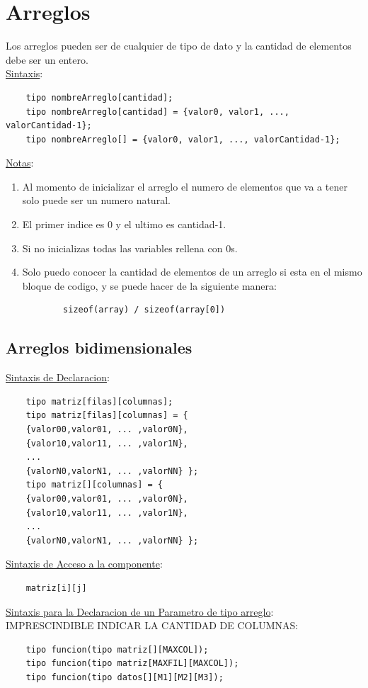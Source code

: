 \documentclass{article}
\begin{document}
\newpage
\section{Arreglos}
Los arreglos pueden ser de cualquier de tipo de dato y la cantidad de elementos debe ser un entero.
\\\underline{Sintaxis}:
\begin{lstlisting}
    tipo nombreArreglo[cantidad];
    tipo nombreArreglo[cantidad] = {valor0, valor1, ..., valorCantidad-1};
    tipo nombreArreglo[] = {valor0, valor1, ..., valorCantidad-1};
\end{lstlisting}
\underline{Notas}:
\begin{enumerate}
    \item Al momento de inicializar el arreglo el numero de elementos que va a tener solo puede ser un numero natural.
    \item El primer indice es 0 y el ultimo es cantidad-1.
    \item Si no inicializas todas las variables rellena con 0s.
    \item Solo puedo conocer la cantidad de elementos de un arreglo si esta en el mismo bloque de codigo, y se puede hacer de la siguiente manera:
    \begin{lstlisting}
        sizeof(array) / sizeof(array[0])
    \end{lstlisting}
\end{enumerate}
\subsection{Arreglos bidimensionales}
\underline{Sintaxis de Declaracion}:
\begin{lstlisting}
    tipo matriz[filas][columnas];
    tipo matriz[filas][columnas] = {
    {valor00,valor01, ... ,valor0N},
    {valor10,valor11, ... ,valor1N},
    ...
    {valorN0,valorN1, ... ,valorNN} };
    tipo matriz[][columnas] = {
    {valor00,valor01, ... ,valor0N},
    {valor10,valor11, ... ,valor1N},
    ...
    {valorN0,valorN1, ... ,valorNN} };
\end{lstlisting}
\underline{Sintaxis de Acceso a la componente}:
\begin{lstlisting}
    matriz[i][j]
\end{lstlisting}
\underline{Sintaxis para la Declaracion de un Parametro de tipo arreglo}:
\\IMPRESCINDIBLE INDICAR LA CANTIDAD DE COLUMNAS:
\begin{lstlisting}
    tipo funcion(tipo matriz[][MAXCOL]);
    tipo funcion(tipo matriz[MAXFIL][MAXCOL]);
    tipo funcion(tipo datos[][M1][M2][M3]);
\end{lstlisting}
\end{document}
